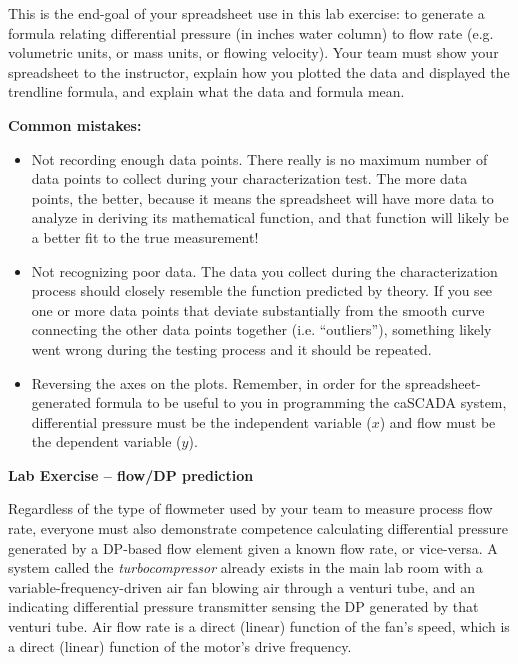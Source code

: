\vskip 10pt

This is the end-goal of your spreadsheet use in this lab exercise: to generate a formula relating differential pressure (in inches water column) to flow rate (e.g. volumetric units, or mass units, or flowing velocity).  Your team must show your spreadsheet to the instructor, explain how you plotted the data and displayed the trendline formula, and explain what the data and formula mean.

\vskip 10pt

{\bf Common mistakes:}

\begin{itemize}
\item{} Not recording enough data points.  There really is no maximum number of data points to collect during your characterization test.  The more data points, the better, because it means the spreadsheet will have more data to analyze in deriving its mathematical function, and that function will likely be a better fit to the true measurement!
\item{} Not recognizing poor data.  The data you collect during the characterization process should closely resemble the function predicted by theory.  If you see one or more data points that deviate substantially from the smooth curve connecting the other data points together (i.e. ``outliers''), something likely went wrong during the testing process and it should be repeated.
\item{} Reversing the axes on the plots.  Remember, in order for the spreadsheet-generated formula to be useful to you in programming the caSCADA system, differential pressure must be the independent variable ($x$) and flow must be the dependent variable ($y$).
\end{itemize}









\vfil \eject

\noindent
{\bf Lab Exercise -- flow/DP prediction}

\vskip 5pt

Regardless of the type of flowmeter used by your team to measure process flow rate, everyone must also demonstrate competence calculating differential pressure generated by a DP-based flow element given a known flow rate, or vice-versa.  A system called the {\it turbocompressor} already exists in the main lab room with a variable-frequency-driven air fan blowing air through a venturi tube, and an indicating differential pressure transmitter sensing the DP generated by that venturi tube.  Air flow rate is a direct (linear) function of the fan's speed, which is a direct (linear) function of the motor's drive frequency.

